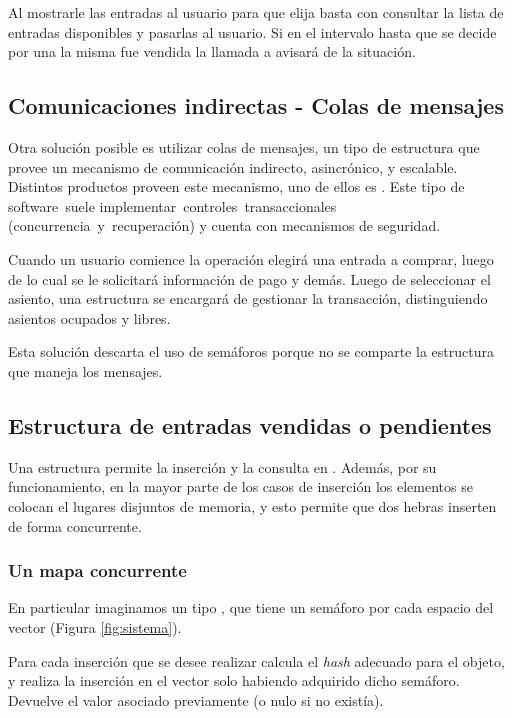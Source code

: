 Al mostrarle las entradas al usuario para que elija basta con consultar la lista
de entradas disponibles y pasarlas al usuario. Si en el intervalo hasta que se
decide por una la misma fue vendida la llamada a 
avisará de la situación.

\subsection{Comunicaciones indirectas - Colas de mensajes}
Otra solución posible es utilizar colas de mensajes, un tipo de estructura que provee un mecanismo de
comunicación indirecto, asincrónico, y escalable.
Distintos productos proveen este mecanismo, uno de ellos es .
Este tipo de software suele implementar controles transaccionales (concurrencia y recuperación)
y cuenta con mecanismos de seguridad.

Cuando un usuario comience la operación elegirá una entrada a comprar, luego de
lo cual se le solicitará información de pago y demás. Luego de seleccionar el asiento,
una estructura  se encargará de gestionar la transacción, distinguiendo
asientos ocupados y libres.

Esta solución descarta el uso de semáforos porque no se comparte la estructura que maneja los mensajes.

\subsection{Estructura de entradas vendidas o pendientes} \label{concurrenthm}
Una estructura  permite la inserción y la consulta en . Además,
por su funcionamiento, en la mayor parte de los casos de inserción los elementos
se colocan el lugares disjuntos de memoria, y esto permite que dos hebras
inserten de forma concurrente.

\subsubsection{Un mapa concurrente}
En particular imaginamos un tipo , que tiene un semáforo por cada espacio del vector (Figura \ref{fig:sistema}).

Para cada inserción que se desee realizar calcula el \emph{hash} adecuado para el objeto,
y realiza la inserción en el vector solo habiendo adquirido dicho semáforo.
Devuelve el valor asociado previamente (o nulo si no existía).

